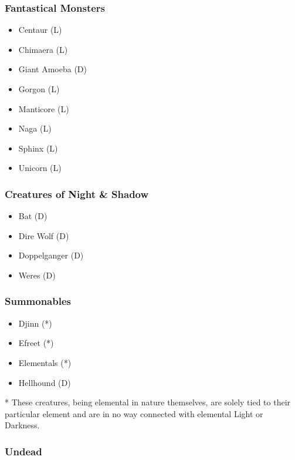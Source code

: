 \begin{multicols}{3}
\subsubsection{Fantastical Monsters}

\begin{itemize}
\item Centaur (L)
\item Chimaera (L)
\item Giant Amoeba (D)
\item Gorgon (L)
\item Manticore (L)
\item Naga (L)
\item Sphinx (L)
\item Unicorn (L)
\end{itemize}

\subsubsection{Creatures of Night \& Shadow}

\begin{itemize}
\item Bat (D)
\item Dire Wolf (D)
\item Doppelganger (D)
\item Weres (D)
\end{itemize}

\subsubsection{Summonables}

\begin{itemize}
\item Djinn (*)
\item Efreet (*)
\item Elementals (*)
\item Hellhound (D)
\end{itemize}

* These creatures, being elemental in nature themselves, are solely
tied to their particular element and are in no way connected with
elemental Light or Darkness.

\subsubsection{Undead}

\begin{itemize}


\end{itemize}
\end{multicols}
